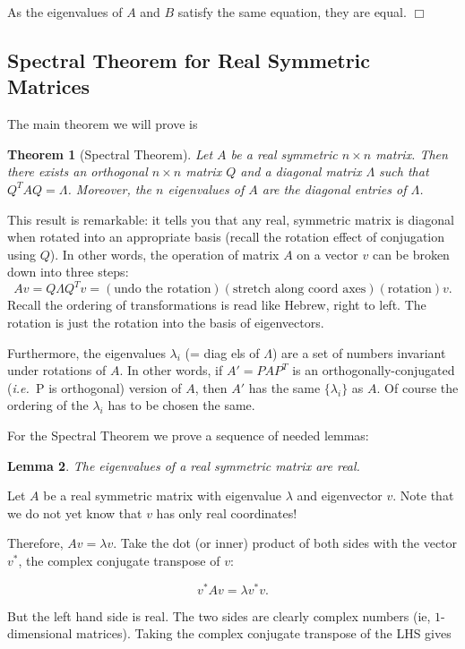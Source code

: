 \documentclass[12pt,letterpaper]{report}
\newcommand\be{\begin{equation}}
\newcommand\ee{\end{equation}}
\newcommand\ie{{\it i.e.\ }}
\newtheorem{thm}{Theorem}[section]
\newtheorem{lem}[thm]{Lemma}
\begin{document}
As the eigenvalues of $A$ and $B$ satisfy the same equation, they
are equal. $\Box$

\subsection{Spectral Theorem for Real Symmetric Matrices}

The main theorem we will prove is

\begin{thm}[Spectral Theorem] Let $A$ be a real symmetric $n
\times n$ matrix. Then there exists an orthogonal $n \times n$
matrix $Q$ and a diagonal matrix $\Lambda$ such that $Q^T A Q =
\Lambda$. Moreover, the $n$ eigenvalues of $A$ are the diagonal
entries of $\Lambda$. \end{thm}

This result is remarkable: it tells you that any real, symmetric
matrix is diagonal when rotated into an appropriate basis (recall
the rotation effect of conjugation using $Q$). In other words, the
operation of matrix $A$ on a vector $v$ can be broken down into
three steps: \be Av = Q \Lambda Q^Tv  = (\mbox{undo the rotation})
(\mbox{stretch along coord axes}) (\mbox{rotation}) v . \ee Recall
the ordering of transformations is read like Hebrew, right to
left. The rotation is just the rotation into the basis of
eigenvectors.

Furthermore, the eigenvalues $\lambda_i$ (= diag els of $\Lambda$)
are a set of numbers invariant under rotations of $A$. In other
words, if $A' = P A P^T$ is an orthogonally-conjugated (\ie P is
orthogonal) version of $A$, then $A'$ has the same $\{\lambda_i\}$
as $A$. Of course the ordering of the $\lambda_i$ has to be chosen
the same.


For the Spectral Theorem we prove a sequence of needed lemmas:

\begin{lem} The eigenvalues of a real symmetric matrix are real.
\end{lem}

Let $A$ be a real symmetric matrix with eigenvalue $\lambda$ and
eigenvector $v$. Note that we do not yet know that $v$ has only
real coordinates!

Therefore, $Av = \lambda v$. Take the dot (or inner) product of
both sides with the vector $v^{*}$, the complex conjugate
transpose of $v$:

\be v^{*} Av = \lambda v^{*} v. \ee

But the left hand side is real. The two sides are clearly complex
numbers (ie, $1$-dimensional matrices). Taking the complex
conjugate transpose of the LHS gives
\end{document}
